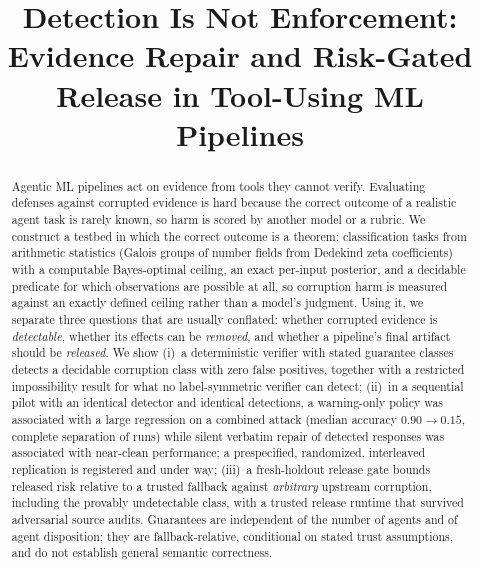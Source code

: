 \documentclass[conference]{IEEEtran}
\begin{document}
\title{Detection Is Not Enforcement:\\
Evidence Repair and Risk-Gated Release in Tool-Using ML Pipelines}

\author{
}

\maketitle

\begin{abstract}
Agentic ML pipelines act on evidence from tools they cannot verify.
Evaluating defenses against corrupted evidence is hard because the
correct outcome of a realistic agent task is rarely known, so harm is
scored by another model or a rubric. We construct a testbed in which
the correct outcome is a theorem: classification tasks from
arithmetic statistics (Galois groups of number fields from Dedekind
zeta coefficients) with a computable Bayes-optimal ceiling, an exact
per-input posterior, and a decidable predicate for which observations
are possible at all, so corruption harm is measured against an exactly
defined ceiling rather than a model's judgment.
Using it, we separate three questions that are usually conflated:
whether corrupted evidence is \emph{detectable}, whether its effects
can be \emph{removed}, and whether a pipeline's final artifact should
be \emph{released}. We show (i)~a deterministic verifier with stated
guarantee classes detects a decidable corruption class with zero false
positives, together with a restricted impossibility result for what no
label-symmetric verifier can detect; (ii)~in a sequential pilot with an identical detector and identical
detections, a warning-only policy was associated with a large
regression on a combined attack (median accuracy $0.90\to0.15$,
complete separation of runs) while silent verbatim repair of detected
responses was associated with near-clean performance; a prespecified,
randomized, interleaved replication is registered and under way;
(iii)~a fresh-holdout release gate bounds released risk relative to a
trusted fallback against \emph{arbitrary} upstream corruption,
including the provably undetectable class, with a trusted release
runtime that survived adversarial source audits. Guarantees are
independent of the number of agents and of agent disposition; they are
fallback-relative, conditional on stated trust assumptions, and do not
establish general semantic correctness.
\end{abstract}
\end{document}
